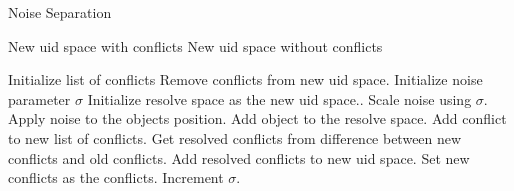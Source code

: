 \documentclass[sigconf,authordraft]{acmart}
\begin{document}
    \begin{algorithm}
        \caption{Noise Separation}
        \label{noise_sep}
        \begin{algorithmic}
            \renewcommand{\algorithmicrequire}{\textbf{Input:}}
            \renewcommand{\algorithmicensure}{\textbf{Output:}}
            \REQUIRE New uid space with conflicts
            \ENSURE New uid space without conflicts

            \STATE Initialize list of conflicts
            \STATE Remove conflicts from new uid space.
            \STATE Initialize noise parameter $\sigma$
                \STATE Initialize resolve space as the new uid space..
                    \STATE Scale noise using $\sigma$.
                    \STATE Apply noise to the objects position.
                    \STATE Add object to the resolve space.
                        \STATE Add conflict to new list of conflicts.
                    \ENDIF
                \ENDFOR
                \STATE Get resolved conflicts from difference between new conflicts and old conflicts.
                \STATE Add resolved conflicts to new uid space.
                \STATE Set new conflicts as the conflicts.
                \STATE Increment $\sigma$.
            \ENDWHILE
        \end{algorithmic}
    \end{algorithm}
\end{document}
